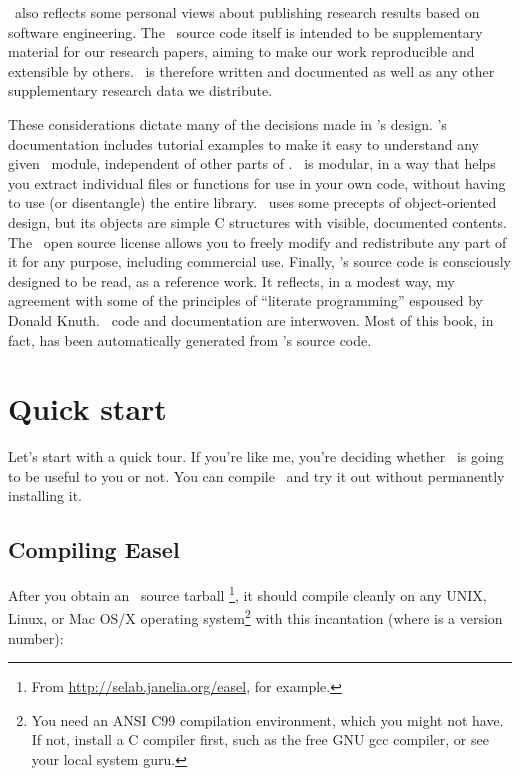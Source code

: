 \Easel\ also reflects some personal views about publishing research
results based on software engineering. The \Easel\ source code itself
is intended to be supplementary material for our research papers,
aiming to make our work reproducible and extensible by others.
\Easel\ is therefore written and documented as well as any other
supplementary research data we distribute.

These considerations dictate many of the decisions made in \Easel's
design.  \Easel's documentation includes tutorial examples to make it
easy to understand any given \Easel\ module, independent of other
parts of \Easel.  \Easel\ is modular, in a way that helps you extract
individual files or functions for use in your own code, without having
to use (or disentangle) the entire library. \Easel\ uses some precepts
of object-oriented design, but its objects are simple C structures
with visible, documented contents. The \Easel\ open source license
allows you to freely modify and redistribute any part of it for any
purpose, including commercial use. Finally, \Easel's source code is
consciously designed to be read, as a reference work. It reflects, in
a modest way, my agreement with some of the principles of ``literate
programming'' espoused by Donald Knuth. \Easel\ code and documentation
are interwoven. Most of this book, in fact, has been automatically
generated from \Easel's source code.

\section{Quick start}

Let's start with a quick tour. If you're like me, you're deciding
whether \Easel\ is going to be useful to you or not. You can compile
\Easel\ and try it out without permanently installing it.

\subsection{Compiling Easel}

After you obtain an \Easel\ source tarball
\footnote{From \url{http://selab.janelia.org/easel}, for example.}, it
should compile cleanly on any UNIX, Linux, or Mac OS/X operating
system\footnote{You need an ANSI C99 compilation environment, which you might
not have. If not, install a C compiler first, such as the free GNU gcc
compiler, or see your local system guru.} with this incantation (where
 is a version number):

